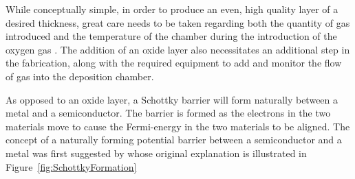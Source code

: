 While conceptually simple, in order to produce an even, high quality layer of a desired thickness, great care needs to be taken regarding both the quantity of gas introduced and the temperature of the chamber during the introduction of the oxygen gas \citep{Cabrera1949, Jaeger1991}. The addition of an oxide layer also necessitates an additional step in the fabrication, along with the required equipment to add and monitor the flow of gas into the deposition chamber.
\par 
As opposed to an oxide layer, a Schottky barrier will form naturally between a metal and a semiconductor. The barrier is formed as the electrons in the two materials move to cause the Fermi-energy in the two materials to be aligned. The concept of a naturally forming potential barrier between a semiconductor and a metal was first suggested by \textcite{Schottky1939} whose original explanation is illustrated in Figure~\ref{fig:SchottkyFormation}
